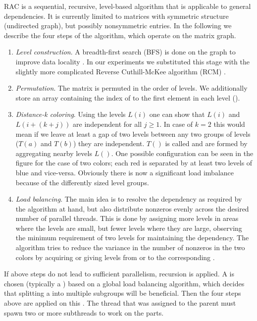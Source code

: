 RAC is a sequential, recursive, level-based algorithm that is applicable to
general \DK dependencies. It is currently limited to matrices
with symmetric structure (undirected graph), but possibly nonsymmetric
entries. In the following we describe the four steps of the
algorithm, which operate on the matrix graph.
\begin{enumerate}
\item \emph{Level construction}.  A breadth-first search (BFS)
  \cite{BFS} is done on the graph to improve data locality
  \cite{RCM_Sparse_computation}. In our experiments we substituted
  this stage with the slightly more complicated Reverse Cuthill-McKee
  algorithm (RCM) \cite{RCM}.
		
\item \emph{Permutation}. The matrix is permuted in the order of
  levels.  We additionally store an array containing the index
  of to the first element in each level (\levelPtr).
		
\item \emph{Distance-k coloring}. Using the levels $L(i)$ one can
  show that $L(i)$ and $L(i+(k+j))$ are \DK independent
  for all $j\geq1$. In case of $k=2$ this would mean if we
  leave at least a gap of two levels between any two groups of levels
  ($T(a)$ and $T(b)$) they are \DTWO independent. $T()$ is called \levelGroups and are formed by aggregating nearby levels $L()$.  One possible
  configuration can be seen in the figure for the case of two colors;
  each red \levelGroup is separated by at least two
  levels of blue and vice-versa. Obviously there is now
  a significant load imbalance because of the differently sized
  level groups.
  		
\item \emph{Load balancing}. The main idea is to resolve the \DK
  dependency as required by the algorithm at hand, but also distribute
  nonzeros evenly across the desired number of parallel threads.  This
  is done by assigning more levels in areas where the levels are
  small, but fewer levels where they are large, observing the minimum
  requirement of two levels for maintaining the \DTWO dependency.
  The algorithm tries to reduce the variance in the number of nonzeros
  in the two colors by acquiring or giving levels from or to the
  corresponding \levelGroup.
\end{enumerate}
If above steps do not lead to sufficient parallelism, recursion is
applied. A \subgraph is chosen  (typically a \levelGroup) based
on a global load balancing algorithm, which decides that splitting
a \levelGroup into multiple subgroups will be beneficial. Then
the four steps above are applied on this \subgraph. The thread
that was assigned to the parent \subgraph must spawn two or more
subthreads to work on the parts. 

